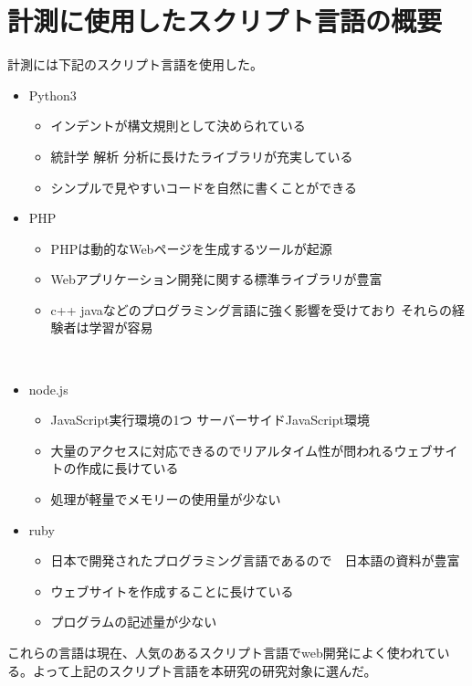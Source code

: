 \chapter{計測に使用したスクリプト言語の概要}
\label{cha:script-language}
計測には下記のスクリプト言語を使用した。
\begin{itemize}
  \item Python3
    \begin{itemize}
      \item インデントが構文規則として決められている
      \item 統計学 解析 分析に長けたライブラリが充実している
      \item シンプルで見やすいコードを自然に書くことができる
    \end{itemize}
  \item PHP
    \begin{itemize}
      \item PHPは動的なWebページを生成するツールが起源
      \item Webアプリケーション開発に関する標準ライブラリが豊富
      \item c++ javaなどのプログラミング言語に強く影響を受けており それらの経験者は学習が容易
    \end{itemize}
　\item node.js
    \begin{itemize}
      \item JavaScript実行環境の1つ サーバーサイドJavaScript環境
      \item 大量のアクセスに対応できるのでリアルタイム性が問われるウェブサイトの作成に長けている
      \item 処理が軽量でメモリーの使用量が少ない
    \end{itemize}
  \item ruby
    \begin{itemize}
      \item 日本で開発されたプログラミング言語であるので　日本語の資料が豊富
      \item ウェブサイトを作成することに長けている
      \item プログラムの記述量が少ない
    \end{itemize}
\end{itemize}
これらの言語は現在、人気のあるスクリプト言語でweb開発によく使われている。よって上記のスクリプト言語を本研究の研究対象に選んだ。
